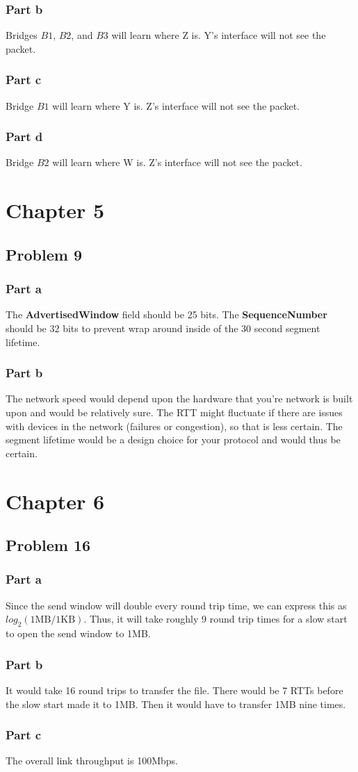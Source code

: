 \documentclass{article}%
\begin{document}
\subsubsection*{Part b}
Bridges $B1$, $B2$, and $B3$ will learn where Z is. Y's interface will not see the packet.

\subsubsection*{Part c}
Bridge $B1$ will learn where Y is. Z's interface will not see the packet.

\subsubsection*{Part d}
Bridge $B2$ will learn where W is. Z's interface will not see the packet.


\section*{Chapter 5}
\subsection*{Problem 9}
\subsubsection*{Part a}
The \textbf{AdvertisedWindow} field should be 25 bits. The \textbf{SequenceNumber} should be 32 bits to
prevent wrap around inside of the 30 second segment lifetime.

\subsubsection*{Part b}
The network speed would depend upon the hardware that you're network is built upon and would be relatively sure. The RTT might
fluctuate if there are issues with devices in the network (failures or congestion), so that is less certain. The segment lifetime
would be a design choice for your protocol and would thus be certain.


\section*{Chapter 6}
\subsection*{Problem 16}
\subsubsection*{Part a}
Since the send window will double every round trip time, we can express this as $log_2(1 \textrm{MB}/ 1 \textrm{KB})$. Thus,
it will take roughly 9 round trip times for a slow start to open the send window to 1MB.

\subsubsection*{Part b}
It would take 16 round trips to transfer the file. There would be 7 RTTs before the slow start made it to 1MB. Then it would have to
transfer 1MB nine times.

\subsubsection*{Part c}
The overall link throughput is 100Mbps.
\end{document}
